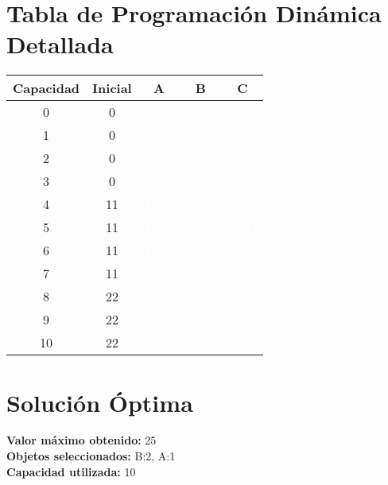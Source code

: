\documentclass{article}
\begin{document}
\section*{Tabla de Programación Dinámica Detallada}
\begin{center}
\scriptsize
\begin{tabular}{|c|c|c|c|c|}
\hline
Capacidad & Inicial & A & B & C \\ \hline
0 & 0 & \cellcolor{rojo}\textcolor{white}{0} & \cellcolor{rojo}\textcolor{white}{0} & \cellcolor{rojo}\textcolor{white}{0} \\ \hline
1 & 0 & \cellcolor{rojo}\textcolor{white}{0} & \cellcolor{rojo}\textcolor{white}{0} & \cellcolor{rojo}\textcolor{white}{0} \\ \hline
2 & 0 & \cellcolor{rojo}\textcolor{white}{0} & \cellcolor{rojo}\textcolor{white}{0} & \cellcolor{rojo}\textcolor{white}{0} \\ \hline
3 & 0 & \cellcolor{rojo}\textcolor{white}{0} & \cellcolor{verde}\textcolor{white}{7(1)} & \cellcolor{rojo}\textcolor{white}{7} \\ \hline
4 & 11 & \cellcolor{verde}\textcolor{white}{11(1)} & \cellcolor{rojo}\textcolor{white}{11} & \cellcolor{rojo}\textcolor{white}{11} \\ \hline
5 & 11 & \cellcolor{verde}\textcolor{white}{11(1)} & \cellcolor{rojo}\textcolor{white}{11} & \cellcolor{verde}\textcolor{white}{12(1)} \\ \hline
6 & 11 & \cellcolor{verde}\textcolor{white}{11(1)} & \cellcolor{verde}\textcolor{white}{14(2)} & \cellcolor{rojo}\textcolor{white}{14} \\ \hline
7 & 11 & \cellcolor{verde}\textcolor{white}{11(1)} & \cellcolor{verde}\textcolor{white}{18(1)} & \cellcolor{rojo}\textcolor{white}{18} \\ \hline
8 & 22 & \cellcolor{verde}\textcolor{white}{22(2)} & \cellcolor{rojo}\textcolor{white}{22} & \cellcolor{rojo}\textcolor{white}{22} \\ \hline
9 & 22 & \cellcolor{verde}\textcolor{white}{22(2)} & \cellcolor{rojo}\textcolor{white}{22} & \cellcolor{verde}\textcolor{white}{23(1)} \\ \hline
10 & 22 & \cellcolor{verde}\textcolor{white}{22(2)} & \cellcolor{verde}\textcolor{white}{25(2)} & \cellcolor{rojo}\textcolor{white}{25} \\ \hline
\end{tabular}
\end{center}
\normalsize

\section*{Solución Óptima}
\textbf{Valor máximo obtenido:} 25\\
\textbf{Objetos seleccionados:} B:2, A:1\\
\textbf{Capacidad utilizada:} 10\\
\end{document}
